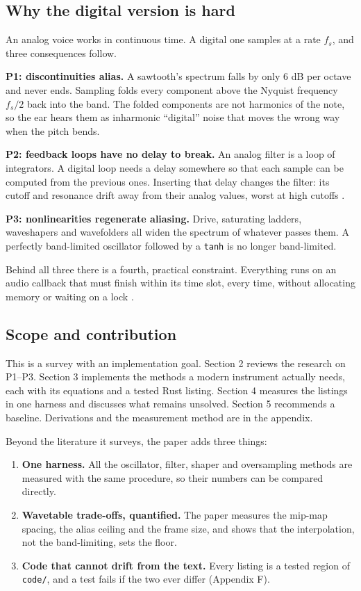 \documentclass[conference]{IEEEtran}
\begin{document}
\setcounter{subsection}{1}
\subsection{Why the digital version is hard}
An analog voice works in continuous time. A digital one samples at a rate $f_s$, and three consequences follow.

\textbf{P1: discontinuities alias.} A sawtooth's spectrum falls by only 6 dB per octave and never ends. Sampling folds every component above the Nyquist frequency $f_s/2$ back into the band. The folded components are not harmonics of the note, so the ear hears them as inharmonic ``digital'' noise that moves the wrong way when the pitch bends.

\textbf{P2: feedback loops have no delay to break.} An analog filter is a loop of integrators. A digital loop needs a delay somewhere so that each sample can be computed from the previous ones. Inserting that delay changes the filter: its cutoff and resonance drift away from their analog values, worst at high cutoffs \cite{r33,r17}.

\textbf{P3: nonlinearities regenerate aliasing.} Drive, saturating ladders, waveshapers and wavefolders all widen the spectrum of whatever passes them. A perfectly band-limited oscillator followed by a \texttt{tanh} is no longer band-limited.

Behind all three there is a fourth, practical constraint. Everything runs on an audio callback that must finish within its time slot, every time, without allocating memory or waiting on a lock \cite{r2,r15}.

\setcounter{subsection}{2}
\subsection{Scope and contribution}
This is a survey with an implementation goal. Section 2 reviews the research on P1–P3. Section 3 implements the methods a modern instrument actually needs, each with its equations and a tested Rust listing. Section 4 measures the listings in one harness and discusses what remains unsolved. Section 5 recommends a baseline. Derivations and the measurement method are in the appendix.

Beyond the literature it surveys, the paper adds three things:

\begin{enumerate}
\item \textbf{One harness.} All the oscillator, filter, shaper and oversampling methods are measured with the same procedure, so their numbers can be compared directly.
\item \textbf{Wavetable trade-offs, quantified.} The paper measures the mip-map spacing, the alias ceiling and the frame size, and shows that the interpolation, not the band-limiting, sets the floor.
\item \textbf{Code that cannot drift from the text.} Every listing is a tested region of \texttt{code/\allowbreak{}}, and a test fails if the two ever differ (Appendix F).
\end{enumerate}
\end{document}
